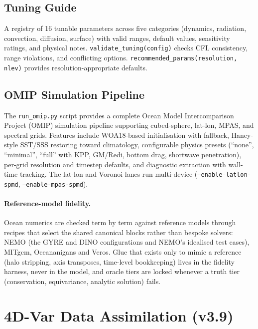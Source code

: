 \documentclass[11pt,a4paper]{article}
\begin{document}
\subsection{Tuning Guide}

A registry of 16 tunable parameters across five categories (dynamics, radiation, convection, diffusion, surface) with valid ranges, default values, sensitivity ratings, and physical notes.  \texttt{validate\_tuning(config)} checks CFL consistency, range violations, and conflicting options.  \texttt{recommended\_params(resolution, nlev)} provides resolution-appropriate defaults.

\subsection{OMIP Simulation Pipeline}

The \texttt{run\_omip.py} script provides a complete Ocean Model Intercomparison Project (OMIP) simulation pipeline supporting cubed-sphere, lat-lon, MPAS, and spectral grids.  Features include WOA18-based initialisation with fallback, Haney-style SST/SSS restoring toward climatology, configurable physics presets (``none'', ``minimal'', ``full'' with KPP, GM/Redi, bottom drag, shortwave penetration), per-grid resolution and timestep defaults, and diagnostic extraction with wall-time tracking.  The lat-lon and Voronoi lanes run multi-device (\texttt{--enable-latlon-spmd}, \texttt{--enable-mpas-spmd}).

\paragraph{Reference-model fidelity.}
Ocean numerics are checked term by term against reference models through recipes that select the shared canonical blocks rather than bespoke solvers: NEMO (the GYRE and DINO configurations and NEMO's idealised test cases), MITgcm, Oceananigans and Veros.  Glue that exists only to mimic a reference (halo stripping, axis transposes, time-level bookkeeping) lives in the fidelity harness, never in the model, and oracle tiers are locked whenever a truth tier (conservation, equivariance, analytic solution) fails.

\section{4D-Var Data Assimilation (v3.9)}
\end{document}
